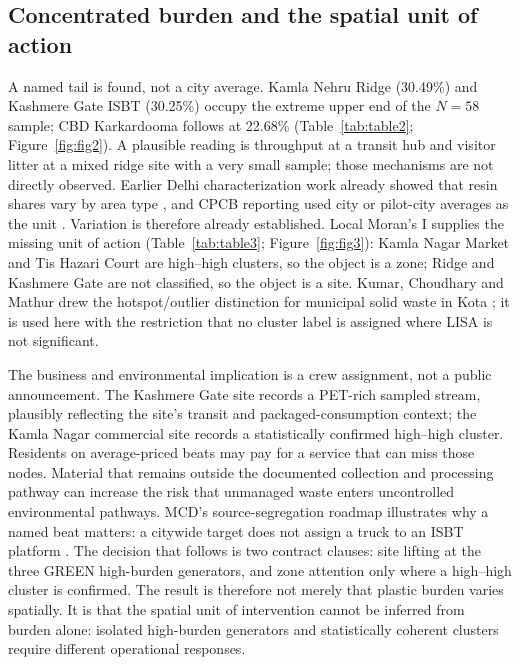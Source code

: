 \documentclass[12pt,a4paper]{article}
\begin{document}
\subsection{Concentrated burden and the spatial unit of action}

A named tail is found, not a city average. Kamla Nehru Ridge (30.49\%) and Kashmere Gate ISBT (30.25\%) occupy the extreme upper end of the $N=58$ sample; CBD Karkardooma follows at 22.68\% (Table~\ref{tab:table2}; Figure~\ref{fig:fig2}). A plausible reading is throughput at a transit hub and visitor litter at a mixed ridge site with a very small sample; those mechanisms are not directly observed. Earlier Delhi characterization work already showed that resin shares vary by area type \citep{delhi_plastic_characterization_study}, and CPCB reporting used city or pilot-city averages as the unit \citep{cpcb_60cities_2015,cpcb_sop_pwm_2024}. Variation is therefore already established. Local Moran's I supplies the missing unit of action (Table~\ref{tab:table3}; Figure~\ref{fig:fig3}): Kamla Nagar Market and Tis Hazari Court are high--high clusters, so the object is a zone; Ridge and Kashmere Gate are not classified, so the object is a site. Kumar, Choudhary and Mathur drew the hotspot/outlier distinction for municipal solid waste in Kota \citep{ieam_kota_landuse_msw_2026}; it is used here with the restriction that no cluster label is assigned where LISA is not significant.

The business and environmental implication is a crew assignment, not a public announcement. The Kashmere Gate site records a PET-rich sampled stream, plausibly reflecting the site's transit and packaged-consumption context; the Kamla Nagar commercial site records a statistically confirmed high--high cluster. Residents on average-priced beats may pay for a service that can miss those nodes. Material that remains outside the documented collection and processing pathway can increase the risk that unmanaged waste enters uncontrolled environmental pathways. MCD's source-segregation roadmap illustrates why a named beat matters: a citywide target does not assign a truck to an ISBT platform \citep{toi_segregation_roadmap_2026,nie_segregation_failed_2026}. The decision that follows is two contract clauses: site lifting at the three GREEN high-burden generators, and zone attention only where a high--high cluster is confirmed. The result is therefore not merely that plastic burden varies spatially. It is that the spatial unit of intervention cannot be inferred from burden alone: isolated high-burden generators and statistically coherent clusters require different operational responses.
\end{document}

